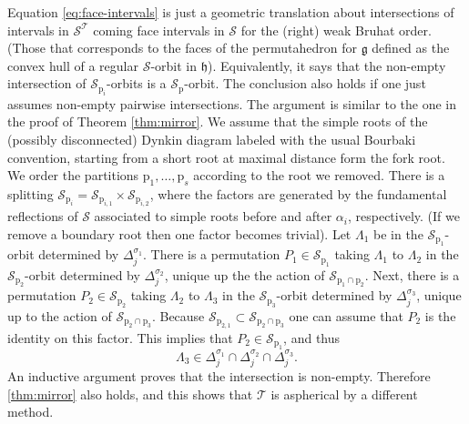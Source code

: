 \documentclass[reqno]{amsart}
\newcommand{\p}{\mathrm{p}}
\renewcommand{\gg}{\mathfrak{g}}
\newcommand{\hh}{\mathfrak{h}}
\newcommand{\cS}{\mathcal{S}}
\newcommand{\cT}{\mathcal{T}}
\begin{document}
Equation \eqref{eq:face-intervals} is just a geometric translation about intersections of intervals in $\cS^\cT$ coming face intervals in $\cS$ for the (right) weak Bruhat order. (Those that corresponds to the faces of the permutahedron for $\gg$ defined as the convex hull of a regular $\cS$-orbit in $\hh$). Equivalently, it says that  the non-empty intersection of  $\cS_{\p_i}$-orbits is a $\cS_{\p}$-orbit.
The conclusion also holds if one just assumes non-empty pairwise intersections. The argument is similar to the one in the proof of Theorem \ref{thm:mirror}.  We assume that the simple roots of the (possibly disconnected) Dynkin diagram labeled with the usual Bourbaki convention, starting from a short root at maximal distance form the fork root.
We order the partitions $\p_1,\dots,\p_s$ according to the root we removed. There is a splitting $\cS_{\p_i}=\cS_{\p_{i,1}}\times \cS_{\p_{i,2}}$, where the factors are generated by the fundamental reflections of $\cS$ associated to simple roots before and after $\alpha_i$, respectively. (If we remove a boundary root then one factor becomes trivial).
Let $\Lambda_1$ be in the $\cS_{\p_1}$-orbit determined by $\Delta_j^{\sigma_1}$.
There is a permutation $P_1\in \cS_{\p_1}$ taking $\Lambda_1$ to $\Lambda_2$ in the $\cS_{\p_2}$-orbit determined by $\Delta_j^{\sigma_2}$,
 unique up the the action of $\cS_{\p_1\cap \p_2}$. Next, there is a permutation  $P_2\in \cS_{\p_2}$ taking $\Lambda_2$ to $\Lambda_3$ in the $\cS_{\p_3}$-orbit determined by $\Delta_j^{\sigma_3}$, unique up to the action of
$\cS_{\p_2\cap \p_3}$. Because $\cS_{\p_{2,1}}\subset \cS_{\p_2\cap \p_3}$ one can assume that $P_2$ is the identity on this factor. This implies that $P_2\in \cS_{\p_1}$, and thus
\[\Lambda_3\in \Delta_j^{\sigma_1}\cap \Delta_j^{\sigma_2}\cap \Delta_j^{\sigma_3}.\]  An inductive argument proves that the intersection is non-empty.  Therefore \ref{thm:mirror} also holds, and this shows that $\cT$ is aspherical by a different method.
\end{document}
